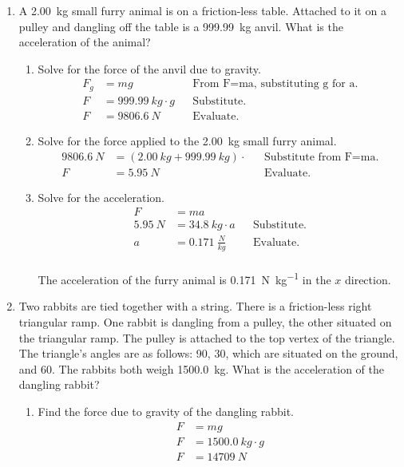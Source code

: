 \documentclass[letterpaper, 12pt]{report}
\begin{document}
\begin{enumerate}
        \item A \SI{2.00}{kg} small furry animal is on a friction-less table. Attached to it on a pulley and dangling off the table is a \SI{999.99}{kg} anvil. What is the acceleration of the animal?
        \begin{enumerate}
            \item Solve for the force of the anvil due to gravity.
                \begin{align}
                    F_g &= mg && \text{From F=ma, substituting g for a.} \\
                    F &= \SI{999.99}{kg} \cdot g && \text{Substitute.} \\
                    F &= \SI{9806.6}{N} && \text{Evaluate.}
                \end{align}
            \item Solve for the force applied to the \SI{2.00}{kg} small furry animal.
                \begin{align}
                    \SI{9806.6}{N} &= (\SI{2.00}{kg} + \SI{999.99}{kg}) \cdot && \text{Substitute from F=ma.} \\
                    F &= \SI{5.95}{N} && \text{Evaluate.}
                \end{align}
            \item Solve for the acceleration.
                \begin{align}
                    F &= ma && \\
                    \SI{5.95}{N} &= \SI{34.8}{kg} \cdot a && \text{Substitute.} \\
                    a &= \SI{0.171}{\frac{N}{kg}} && \text{Evaluate.}
                \end{align}
                \hfill
                    \\
                    The acceleration of the furry animal is \SI{0.171}{\newton\per\kilogram} in the $x$ direction. \\
        \end{enumerate}
        
        
        \item Two rabbits are tied together with a string. There is a friction-less right triangular ramp. One rabbit is dangling from a pulley, the other situated on the triangular ramp. The pulley is attached to the top vertex of the triangle. \\
        The triangle's angles are as follows: 90\degree, 30\degree, which are situated on the ground, and 60\degree. The rabbits both weigh \SI{1500.0}{kg}. What is the acceleration of the dangling rabbit?
        \begin{enumerate}
            \item Find the force due to gravity of the dangling rabbit.
                \begin{align}
                    F &= mg \\
                    F &= \SI{1500.0}{kg} \cdot g \\
                    F &= \SI{14709}{N}
                \end{align}
                

\end{enumerate}
\end{enumerate}
\end{document}

